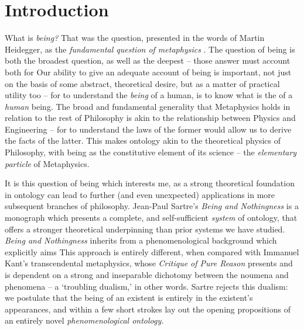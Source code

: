 \chapter{Introduction}



What is \emph{being?}  That was the question, presented in the words of Martin Heidegger, as the \emph{fundamental question of metaphysics} \autocite[1]{Heidegger}. The question of being is both the broadest question, as well as the deepest -- those answer must account both for  Our ability to give an adequate account of being is important, not just on the basis of some abstract, theoretical desire, but as a matter of practical utility too -- for to understand the \emph{being} of a human, is to know what is the  of a \emph{human} being. The broad and fundamental generality that Metaphysics holds in relation to the rest of Philosophy is akin to the relationship between Physics and Engineering -- for to understand the laws of the former would allow us to derive the facts of the latter. This makes ontology akin to the theoretical physics of Philosophy, with being as the constitutive element of its science -- the \emph{elementary particle} of Metaphysics.


It is this question of being which interests me, as a strong theoretical foundation in ontology can lead to further (and even unexpected) applications in more subsequent branches of philosophy. Jean-Paul Sartre's \emph{Being and Nothingness} is a monograph which presents a complete, and self-sufficient \emph{system} of ontology, that offers a stronger theoretical underpinning than prior systems we have studied. \emph{Being and Nothingness} inherits from a phenomenological background which explicitly aims  This approach is entirely different, when compared with Immanuel Kant's transcendental metaphysics, whose \emph{Critique of Pure Reason} presents and is dependent on a strong and inseparable dichotomy between the noumena and phenomena -- a \enquote*{troubling dualism,} in other words. Sartre rejects this dualism: we postulate that the being of an existent is entirely in the existent's appearances, and within a few short strokes lay out the opening propositions of an entirely novel \emph{phenomenological ontology.}

